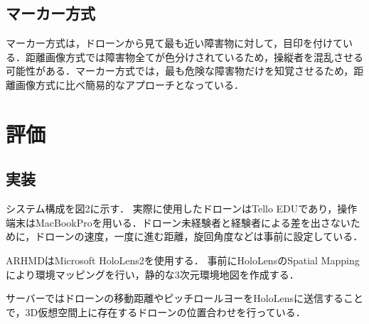 \documentclass[a4j,10pt,twocolumn]{jarticle}
\begin{document}
\subsection{マーカー方式}
マーカー方式は，ドローンから見て最も近い障害物に対して，目印を付けている．距離画像方式では障害物全てが色分けされているため，操縦者を混乱させる可能性がある．マーカー方式では，最も危険な障害物だけを知覚させるため，距離画像方式に比べ簡易的なアプローチとなっている．


\section{評価}
\subsection{実装}
システム構成を図2に示す．
実際に使用したドローンはTello EDUであり，操作端末はMacBookProを用いる．ドローン未経験者と経験者による差を出さないために，ドローンの速度，一度に進む距離，旋回角度などは事前に設定している．
\par
ARHMDはMicrosoft HoloLens2を使用する．
事前にHoloLensのSpatial Mappingにより環境マッピングを行い，静的な3次元環境地図を作成する．

\par
サーバーではドローンの移動距離やピッチロールヨーをHoloLensに送信することで，3D仮想空間上に存在するドローンの位置合わせを行っている．
\end{document}
